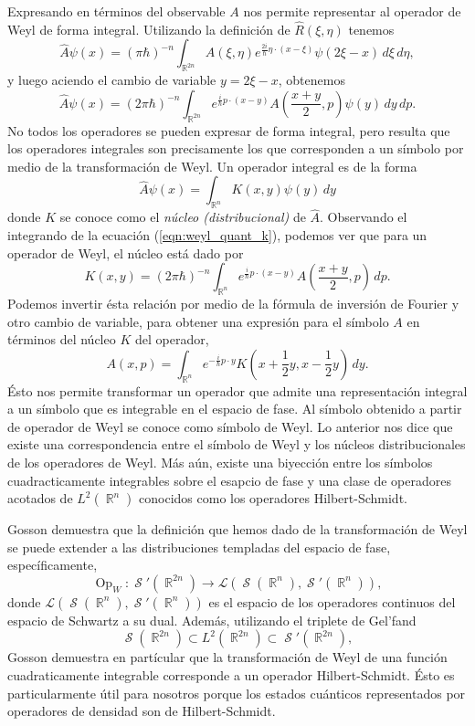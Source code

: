 \documentclass[a4paper]{report}
\DeclareMathOperator{\R}{\mathbb{R}}
\DeclareMathOperator{\Sz}{\mathcal S}
\DeclareMathOperator{\Op}{Op}
\begin{document}
  Expresando en términos del observable $A$ nos permite
  representar al operador de Weyl de forma integral.
  Utilizando la definición de $\hat{R}(\xi,\eta)$ tenemos
  \[
    \hat{A}\psi(x)
    = (\pi\hbar)^{-n} \int_{\R^{2n}} A(\xi,\eta)
    e^{\frac{2i}{\hbar} \eta \cdot (x - \xi)} \psi(2\xi - x)
    \, d\xi \, d\eta,
  \] 
  y luego aciendo el cambio de variable $y = 2\xi - x$,
  obtenemos
  \begin{equation}
    \label{eqn:weyl_quant_k}
    \hat{A}\psi(x)
    = (2\pi\hbar)^{-n} \int_{\R^{2n}} e^{\frac{i}{\hbar} p
    \cdot (x - y)} A\left( \frac{x+y}{2}, p \right) \psi(y)
    \, dy \, dp.
  \end{equation}
  No todos los operadores se pueden expresar de forma
  integral, pero resulta que los operadores integrales son
  precisamente los que corresponden a un símbolo por medio
  de la transformación de Weyl. Un operador integral es de
  la forma
  \[
    \hat{A}\psi(x) = \int_{\R^{n}} K(x,y) \psi(y) \, dy
  \] 
  donde $K$ se conoce como el \textit{núcleo
  (distribucional)} de $\hat{A}$. Observando el integrando
  de la ecuación (\ref{eqn:weyl_quant_k}), podemos ver que
  para un operador de Weyl, el núcleo está dado por
  \begin{equation}
    K(x,y)
    = (2\pi\hbar)^{-n} \int_{\R^{n}} e^{\frac{i}{\hbar} p
    \cdot (x - y)}A\left( \frac{x+y}{2}, p \right) \, dp.
  \end{equation}
  Podemos invertir ésta relación por medio de la fórmula de
  inversión de Fourier y otro cambio de variable, para
  obtener una expresión para el símbolo $A$ en términos del
  núcleo $K$ del operador,
  \begin{equation}
    A(x,p)
    = \int_{\R^{n}} e^{-\frac{i}{\hbar} p \cdot y} K\left( x
    + \frac{1}{2}y, x - \frac{1}{2}y\right) \, dy.
  \end{equation}
  Ésto nos permite transformar un operador que admite una
  representación integral a un símbolo que es integrable en
  el espacio de fase. Al símbolo obtenido a partir de
  operador de Weyl se conoce como símbolo de Weyl. Lo
  anterior nos dice que existe una correspondencia entre el
  símbolo de Weyl y los núcleos distribucionales de los
  operadores de Weyl. Más aún, existe una biyección entre
  los símbolos cuadracticamente integrables sobre el esapcio
  de fase y una clase de operadores acotados de
  $L^2(\R^{n})$ conocidos como los operadores
  Hilbert-Schmidt.

  Gosson demuestra que la definición que hemos dado de la
  transformación de Weyl se puede extender a las
  distribuciones templadas del espacio de fase,
  específicamente, 
  \[
    \Op_W : \Sz'(\R^{2n}) \to \mathcal
    L(\Sz(\R^{n}),\Sz'(\R^{n})),
  \]
  donde $\mathcal L(\Sz(\R^{n}),\Sz'(\R^{n}))$ es el espacio
  de los operadores continuos del espacio de Schwartz a su
  dual. Además, utilizando el triplete de Gel'fand
  \[
    \Sz(\R^{2n})
    \subset L^2(\R^{2n})
    \subset \Sz'(\R^{2n}),
  \]
  Gosson demuestra en partícular que la transformación de
  Weyl de una función cuadraticamente integrable corresponde
  a un operador Hilbert-Schmidt. Ésto es particularmente
  útil para nosotros porque los estados cuánticos
  representados por operadores de densidad son de
  Hilbert-Schmidt.
\end{document}
